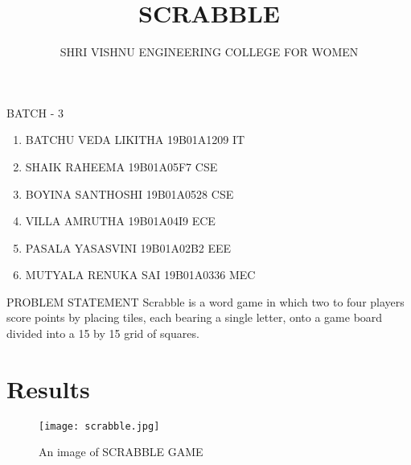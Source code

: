 \documentclass[13.5pt]{beamer}
\title[SCRABBLE]{SCRABBLE}
\author{SHRI VISHNU ENGINEERING COLLEGE FOR WOMEN}
\institute{BHIMAVARAM}
\begin{document}
\begin{frame}
  \titlepage
\end{frame}

\begin{frame}{BATCH - 3}
\begin{enumerate}
    \item BATCHU VEDA LIKITHA \hspace {0.5cm}19B01A1209 \hspace {1cm}IT
    \item SHAIK RAHEEMA \hspace{1.7cm} 19B01A05F7 \hspace{0.8cm}  CSE
    \item BOYINA SANTHOSHI \hspace{1.2cm}19B01A0528 \hspace{0.95cm}CSE
    \item VILLA AMRUTHA \hspace{1.7cm} 19B01A04I9 \hspace{1cm}ECE
    \item PASALA YASASVINI \hspace{1.4cm}19B01A02B2 \hspace{0.9cm}EEE
    \item MUTYALA RENUKA SAI \hspace{0.6cm}19B01A0336 \hspace{1cm}MEC

\end{enumerate}
    
    
\end{frame}
\begin{frame}{PROBLEM STATEMENT}
Scrabble is a word game in which two to four players score points by placing tiles, each bearing a single letter, onto a game board divided into a 15 by 15 grid of squares.

\end{frame}

\section{Results}

\begin{frame}

\begin{figure}[htp]
    \centering
    \texttt{[image: scrabble.jpg]}
    \caption{An image of SCRABBLE GAME}
    \label{fig:scrabble}
\end{figure}

\end{frame}
\end{document}
